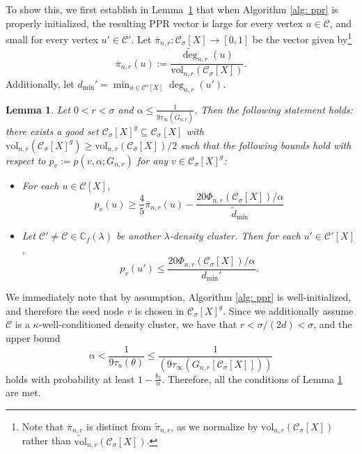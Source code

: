 \documentclass[11pt,twoside]{article}
\newtheorem{lemma}{Lemma}
\theoremstyle{definition}
\newcommand{\vol}{\mathrm{vol}}
\newcommand{\1}{\mathbbm{1}}
\newcommand{\taubf}{\tau_{u}}
\newcommand{\pbf}{p}        %
\newcommand{\pibf}{\pi}
\newcommand{\Xbf}{X}
\newcommand{\Cbb}{\mathbb{C}}
\newcommand{\Cset}{\mathcal{C}}
\newcommand{\Csig}{\Cset_{\sigma}}
\newcommand{\degminpr}{d_{\min}'}
\newcommand{\degminwt}{\widetilde{d}_{\min}}
\begin{document}
To show this, we first establish in Lemma~\ref{lem: setup} that when Algorithm \ref{alg: ppr} is properly initialized, the resulting PPR vector is large for every vertex $u \in \Cset$, and small for every vertex $u' \in \Cset'$. Let $\overline{\pibf}_{n,r}: \Csig[\Xbf] \to [0,1]$ be the vector given by\footnote{Note that $\overline{\pibf}_{n,r}$ is distinct from $\widetilde{\pibf}_{n,r}$, as we normalize by $\vol_{n,r}(\Csig[\Xbf])$ rather than $\widetilde{\vol}_{n,r}(\Csig[\Xbf])$.} 
\begin{equation*}
\overline{\pibf}_{n,r}(u) := \frac{\widetilde{\deg}_{n,r}(u)}{\vol_{n,r}(\Csig[\Xbf])}.
\end{equation*} Additionally, let $\degminpr = \min_{u \in \Cset'[\Xbf]} \deg_{n,r}(u')$. 

\begin{lemma} 
	\label{lem: setup}
	Let $0 < r < \sigma$ and $\alpha \leq \frac{1}{9 \tau_{\infty}(\widetilde{G}_{n,r})}$. Then the following statement holds: there exists a good set $\Csig[\Xbf]^g \subseteq \Csig[\Xbf]$ with $\vol_{n,r}(\Csig[\Xbf]^g) \geq \vol_{n,r}(\Csig[\Xbf])/2$ such that the following bounds hold with respect to $\pbf_v := \pbf(v,\alpha;G_{n,r})$ for any $v \in \Csig[\Xbf]^g$:
	\begin{itemize}
		\item For each $u \in \Cset[\Xbf]$,
		\begin{equation}
		\label{eqn: lower_bound_PPR_in_cluster}
		\pbf_v(u) \geq \frac{4}{5} \overline{\pibf}_{n,r}(u) - \frac{20 \Phi_{n,r}(\Csig[\Xbf])/\alpha}{\degminwt}
		\end{equation}
		\item Let $\Cset' \neq \Cset \in \Cbb_f(\lambda)$ be another $\lambda$-density cluster. Then for each $u' \in \Cset'[\Xbf]$,
		\begin{equation}
		\label{eqn: upper_bound_PPR_in_other_cluster}
		\pbf_v(u') \leq \frac{20 \Phi_{n,r}(\Csig[\Xbf])/\alpha}{\degminpr}.
		\end{equation}
	\end{itemize}
\end{lemma}

We immediately note that by assumption, Algorithm \ref{alg: ppr} is well-initialized, and therefore the seed node $v$ is chosen in $\Csig[\Xbf]^g$. Since we additionally assume $\Cset$ is a $\kappa$-well-conditioned density cluster, we have that $r < \sigma/(2d) < \sigma$, and the upper bound 
\begin{equation*}
\alpha < \frac{1}{9\taubf(\theta)} \leq \frac{1}{(9 \tau_{\infty}(G_{n,r}[\Csig[\Xbf]]))}
\end{equation*}
holds with probability at least $1 - \frac{b_2}{n}$.
Therefore, all the conditions of Lemma \ref{lem: setup} are met. 
\end{document}
